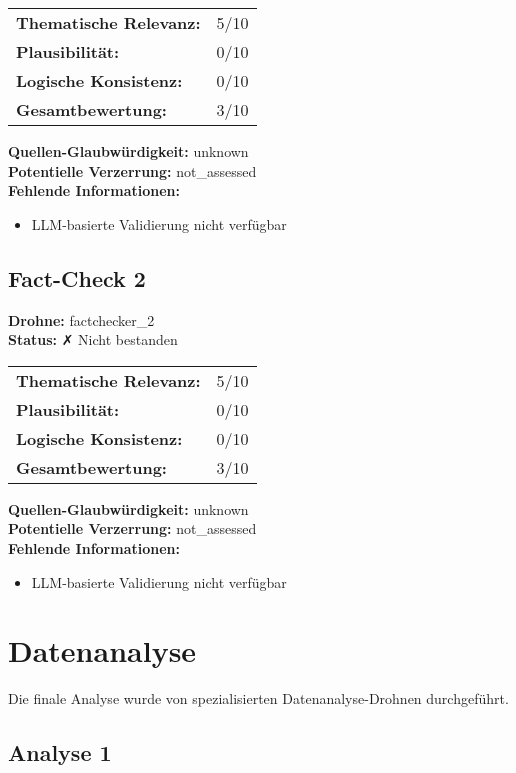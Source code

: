 \documentclass[12pt,a4paper]{article}
\begin{document}
\begin{tabular}{ll}
\textbf{Thematische Relevanz:} & 5/10 \\
\textbf{Plausibilität:} & 0/10 \\
\textbf{Logische Konsistenz:} & 0/10 \\
\textbf{Gesamtbewertung:} & 3/10 \\
\end{tabular}

\textbf{Quellen-Glaubwürdigkeit:} unknown\\
\textbf{Potentielle Verzerrung:} not\_assessed\\
\textbf{Fehlende Informationen:}
\begin{itemize}
\item LLM-basierte Validierung nicht verfügbar
\end{itemize}

\subsection{Fact-Check 2}

\textbf{Drohne:} factchecker\_2\\
\textbf{Status:} ✗ Nicht bestanden\\

\begin{tabular}{ll}
\textbf{Thematische Relevanz:} & 5/10 \\
\textbf{Plausibilität:} & 0/10 \\
\textbf{Logische Konsistenz:} & 0/10 \\
\textbf{Gesamtbewertung:} & 3/10 \\
\end{tabular}

\textbf{Quellen-Glaubwürdigkeit:} unknown\\
\textbf{Potentielle Verzerrung:} not\_assessed\\
\textbf{Fehlende Informationen:}
\begin{itemize}
\item LLM-basierte Validierung nicht verfügbar
\end{itemize}


\newpage
\section{Datenanalyse}

Die finale Analyse wurde von spezialisierten Datenanalyse-Drohnen durchgeführt.

\subsection{Analyse 1}
\end{document}
